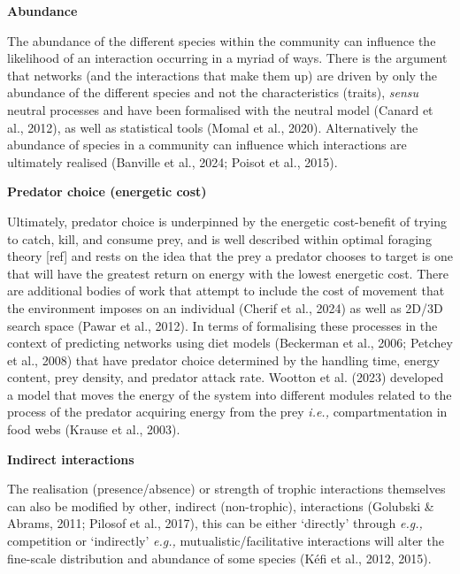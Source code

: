 \documentclass[
]{article}
\begin{document}
\textbf{Abundance}

The abundance of the different species within the community can
influence the likelihood of an interaction occurring in a myriad of
ways. There is the argument that networks (and the interactions that
make them up) are driven by only the abundance of the different species
and not the characteristics (traits), \emph{sensu} neutral processes and
have been formalised with the neutral model (Canard et al., 2012), as
well as statistical tools (Momal et al., 2020). Alternatively the
abundance of species in a community can influence which interactions are
ultimately realised (Banville et al., 2024; Poisot et al., 2015).

\textbf{Predator choice (energetic cost)}

Ultimately, predator choice is underpinned by the energetic cost-benefit
of trying to catch, kill, and consume prey, and is well described within
optimal foraging theory {[}ref{]} and rests on the idea that the prey a
predator chooses to target is one that will have the greatest return on
energy with the lowest energetic cost. There are additional bodies of
work that attempt to include the cost of movement that the environment
imposes on an individual (Cherif et al., 2024) as well as 2D/3D search
space (Pawar et al., 2012). In terms of formalising these processes in
the context of predicting networks using diet models (Beckerman et al.,
2006; Petchey et al., 2008) that have predator choice determined by the
handling time, energy content, prey density, and predator attack rate.
Wootton et al. (2023) developed a model that moves the energy of the
system into different modules related to the process of the predator
acquiring energy from the prey \emph{i.e.,} compartmentation in food
webs (Krause et al., 2003).

\textbf{Indirect interactions}

The realisation (presence/absence) or strength of trophic interactions
themselves can also be modified by other, indirect (non-trophic),
interactions (Golubski \& Abrams, 2011; Pilosof et al., 2017), this can
be either `directly' through \emph{e.g.,} competition or `indirectly'
\emph{e.g.,} mutualistic/facilitative interactions will alter the
fine-scale distribution and abundance of some species (Kéfi et al.,
2012, 2015).
\end{document}
